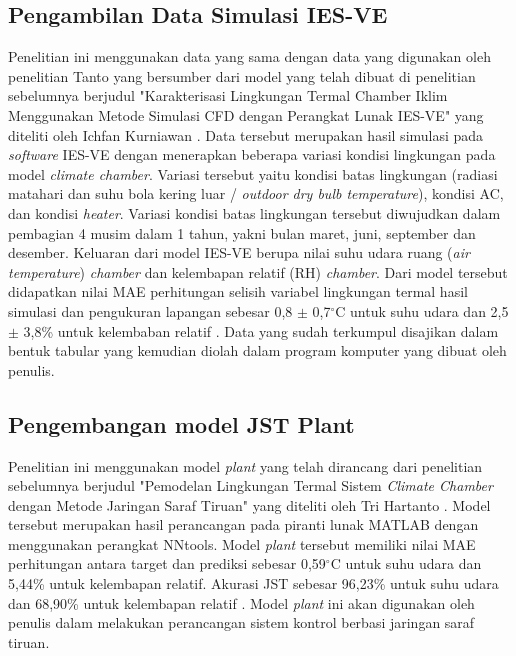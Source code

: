 \subsection{Pengambilan Data Simulasi IES-VE}
Penelitian ini menggunakan data yang sama dengan data yang digunakan oleh penelitian Tanto \cite{skripsiTanto} yang bersumber dari model yang telah dibuat di penelitian sebelumnya berjudul "Karakterisasi Lingkungan Termal Chamber Iklim Menggunakan Metode Simulasi CFD dengan Perangkat Lunak IES-VE" yang diteliti oleh Ichfan Kurniawan \cite{skripsiIchfan}.  Data tersebut merupakan hasil simulasi pada \textit{software} IES-VE dengan menerapkan beberapa variasi kondisi lingkungan pada model \textit{climate chamber}. Variasi tersebut yaitu kondisi batas lingkungan (radiasi matahari dan suhu bola kering luar / \textit{outdoor dry bulb temperature}), kondisi AC, dan kondisi \textit{heater}. Variasi kondisi batas lingkungan tersebut diwujudkan dalam pembagian 4 musim dalam 1 tahun, yakni bulan maret, juni, september dan desember. Keluaran dari model IES-VE berupa nilai suhu udara ruang (\textit{air temperature}) \textit{chamber} dan kelembapan relatif (RH) \textit{chamber}. Dari model tersebut didapatkan nilai MAE perhitungan selisih variabel lingkungan termal hasil simulasi dan pengukuran lapangan sebesar 0,8 $\pm$ 0,7$^{\circ}$C untuk suhu udara dan 2,5 $\pm$ 3,8\% untuk kelembaban relatif \cite{skripsiIchfan}. Data yang sudah terkumpul disajikan dalam bentuk tabular yang kemudian diolah dalam program komputer yang dibuat oleh penulis.

\subsection{Pengembangan model JST Plant}
Penelitian ini menggunakan model \textit{plant} yang telah dirancang dari penelitian sebelumnya berjudul "Pemodelan Lingkungan Termal Sistem \textit{Climate Chamber} dengan Metode Jaringan Saraf Tiruan" yang diteliti oleh Tri Hartanto \cite{skripsiTanto}. Model tersebut merupakan hasil perancangan pada piranti lunak MATLAB dengan menggunakan perangkat NNtools. Model \textit{plant} tersebut memiliki nilai MAE perhitungan antara target dan prediksi sebesar 0,59$^{\circ}$C untuk suhu udara dan 5,44\% untuk kelembapan relatif. Akurasi JST sebesar 96,23\% untuk suhu udara dan 68,90\% untuk kelembapan relatif \cite{skripsiTanto}. Model \textit{plant} ini akan digunakan oleh penulis dalam melakukan perancangan sistem kontrol berbasi jaringan saraf tiruan.

